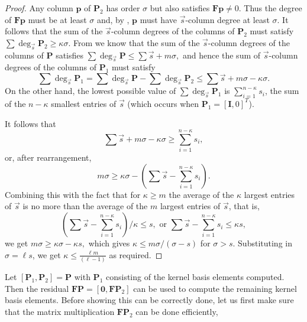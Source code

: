 \begin{proof}
Any column $\mathbf{p}$ of $\mathbf{P}_{2}$ has order $\sigma$
but also satisfies $\mathbf{F}\mathbf{p}\ne0$. Thus the degree of
$\mathbf{F}\mathbf{p}$ must be at least $\sigma$ and, by ,
$\mathbf{p}$ must have $\vec{s}$-column degree at least $\sigma$.
It follows that the sum of the $\vec{s}$-column degrees of the columns
of $\mathbf{P}_{2}$ must satisfy $\sum\deg_{\vec{s}}\mathbf{P}_{2}\ge\kappa\sigma.$
From  we know
that the sum of the $\vec{s}$-column degrees of the columns of $\mathbf{P}$
satisfies $\sum\deg_{\vec{s}}\mathbf{P}\le\sum\vec{s}+m\sigma,$ and
hence the sum of $\vec{s}$-column degrees of the columns of $\mathbf{P}_{1}$
must satisfy 
\[
\sum\deg_{\vec{s}}\mathbf{P}_{1}=\sum\deg_{\vec{s}}\mathbf{P}-\sum\deg_{\vec{s}}\mathbf{P}_{2}\le\sum\vec{s}+m\sigma-\kappa\sigma.
\]
 On the other hand, the lowest possible value of $\sum\deg_{\vec{s}}\mathbf{P}_{1}$
is $\sum_{i=1}^{n-\kappa}s_{i}$, the sum of the $n-\kappa$ smallest
entries of $\vec{s}$ (which occurs when $\mathbf{P}_{1}=\left[\mathbf{I},0\right]^{T}$).%
\begin{comment}
based on the assumption that the entries of $\vec{s}=\left[s_{1},\dots,s_{n}\right]$
are arranged in increasing order. 
\end{comment}
{} It follows that 
\[
\sum\vec{s}+m\sigma-\kappa\sigma\ge\sum_{i=1}^{n-\kappa}s_{i},
\]
 or, after rearrangement, 
\[
m\sigma\ge\kappa\sigma-\left(\sum\vec{s}-\sum_{i=1}^{n-\kappa}s_{i}\right).
\]
 Combining this with the fact that for $\kappa\ge m$ the average
of the $\kappa$ largest entries of $\vec{s}$ is no more than the
average of the $m$ largest entries of $\vec{s}$, that is, 
\[
\left(\sum\vec{s}-\sum_{i=1}^{n-\kappa}s_{i}\right)/\kappa\le s,\mbox{ or }\sum\vec{s}-\sum_{i=1}^{n-\kappa}s_{i}\le\kappa s,
\]
 we get $m\sigma\ge\kappa\sigma-\kappa s,$ which gives $\kappa\le m\sigma/(\sigma-s)$
for $\sigma>s$. Substituting in $\sigma=\ell s$, we get $\kappa\le\frac{\ell m}{(\ell-1)}$
as required. 
\end{proof}
Let $\left[\mathbf{P}_{1},\mathbf{P}_{2}\right]=\mathbf{P}$ with
$\mathbf{P}_{1}$ consisting of the kernel basis elements computed.
Then the residual $\mathbf{F}\mathbf{P}=\left[\mathbf{0},\mathbf{F}\mathbf{P}_{2}\right]$
can be used to compute the remaining kernel basis elements. Before
showing this can be correctly done, let us first make sure that the
matrix multiplication $\mathbf{F}\mathbf{P}_{2}$ can be done efficiently,
